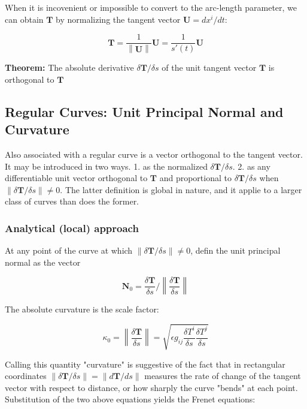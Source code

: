 \documentclass{article}
\newcommand\norm[1]{\left\lVert#1\right\rVert}
\begin{document}
When it is incovenient or impossible to convert to the arc-length parameter, we can obtain $\mathbf{ T }$ by normalizing the tangent vector $\mathbf{ U } = dx^i / dt$:

\begin{equation*}
	\mathbf{ T } = \frac{ 1 }{ \norm{ \mathbf{ U } } } \mathbf{ U } = \frac{ 1 }{ s'(t) } \mathbf{ U }
\end{equation*}

\noindent \textbf{Theorem: }
The absolute derivative $\delta \mathbf{ T } / \delta s$ of the unit tangent vector $\mathbf{ T }$ is orthogonal to $\mathbf{ T }$

\subsection{Regular Curves: Unit Principal Normal and Curvature}

Also associated with a regular curve is a vector orthogonal to the tangent vector.  It may be introduced in two ways.  1. as the normalized $\delta \mathbf{ T } / \delta s$. 2. as any differentiable unit vector
orthogonal to $\mathbf{ T }$ and proportional to $\delta \mathbf{ T } / \delta s$ when $\norm{ \delta \mathbf{ T } / \delta s } \neq 0$.  The latter definition is global in nature,
and it applie to a larger class of curves than does the former.

\subsubsection{Analytical (local) approach}

At any point of the curve at which $\norm{ \delta \mathbf{ T } / \delta s } \neq 0$, defin the unit principal normal as the vector

\begin{equation}
	\mathbf{ N }_0 = \frac{ \delta \mathbf{ T } }{ \delta s } / \norm{ \frac{ \delta \mathbf{ T } }{ \delta s } }
\end{equation}

\noindent
The absolute curvature is the scale factor:

\begin{equation}
	\kappa_0 = \norm{ \frac{ \delta \mathbf{ T } }{ \delta s } } = \sqrt{ \epsilon g_{ij} \frac{ \delta T^i }{ \delta s } \frac{ \delta T^j }{ \delta s } }
\end{equation}

Calling this quantity "curvature" is suggestive of the fact that in rectangular coordinates $\norm{ \delta \mathbf{ T } / \delta s } = \norm{ d \mathbf{ T } / ds }$ measures the rate of change of the tangent vector with respect
to distance, or how sharply the curve "bends" at each point.  Substitution of the two above equations yields the Frenet equations:
\end{document}
